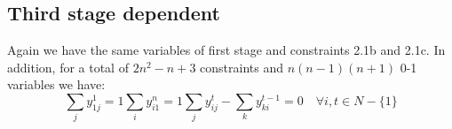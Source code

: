 \subsection{Third stage dependent}
Again we have the same variables of first stage and constraints 2.1b and 2.1c. In addition, 
for a total of $2n^2-n+3$ constraints and $n(n-1)(n+1)$ 0-1 variables we have:
\begin{subequations}
	\begin{equation}
		\sum_{j} y_{1j}^1 = 1
	\end{equation}
	\begin{equation}
		\sum_{i} y_{i1}^n = 1
	\end{equation}
	\begin{equation}
		\sum_{j} y_{ij}^t - \sum_{k} y_{ki}^{t-1} = 0 \quad \forall i,t \in N-\lbrace 1 \rbrace
	\end{equation}
\end{subequations}

